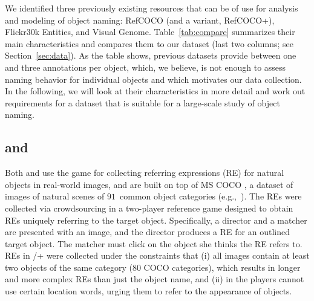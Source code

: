 We identified three previously existing resources that can be of use for analysis and modeling of object naming: RefCOCO (and a variant, RefCOCO+), Flickr30k Entities, and Visual Genome. %
Table~\ref{tab:compare} summarizes their main characteristics and compares them to our dataset (last two columns; see Section~\ref{sec:data}).
As the table shows, previous datasets provide between one and three annotations per object, which, we believe, is not enough to assess naming behavior for individual objects and which
motivates our data collection. %
In the following, we will look at their characteristics in more detail and work out requirements for a dataset that is suitable for a large-scale study of object naming.

\subsection{ and }

Both  and  \cite{Yu2016} use the \cite{Kazemzadeh2014} game for collecting referring expressions (RE) for natural objects in real-world images, and are built on top of MS COCO \cite{mscoco}, 
a dataset of images of natural scenes of $91$~common object categories (e.g.,~). 
The REs were collected via crowdsourcing in a two-player reference game designed to obtain REs uniquely referring to the target object. 
Specifically, a director and a matcher are presented with an image, and the director produces a RE for an outlined target object. 
The matcher must click on the object she thinks the RE refers to. %
REs in /+ were collected under the constraints that (i) all images contain at least two objects of the same category (80 COCO categories), which results in longer and more complex REs than just the object name, and (ii) in  the players cannot use certain  location words, urging them to refer to the appearance of objects.

